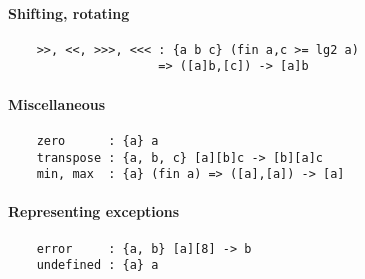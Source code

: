 \paragraph*{Shifting, rotating}
\begin{Verbatim}
    >>, <<, >>>, <<< : {a b c} (fin a,c >= lg2 a) 
                     => ([a]b,[c]) -> [a]b
\end{Verbatim}
\paragraph*{Miscellaneous}
\begin{Verbatim}
    zero      : {a} a
    transpose : {a, b, c} [a][b]c -> [b][a]c
    min, max  : {a} (fin a) => ([a],[a]) -> [a]
\end{Verbatim}
\paragraph*{Representing exceptions}
\begin{Verbatim}
    error     : {a, b} [a][8] -> b
    undefined : {a} a
\end{Verbatim}


